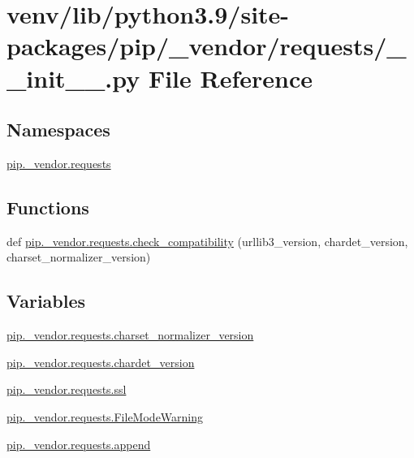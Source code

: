 \hypertarget{venv_2lib_2python3_89_2site-packages_2pip_2__vendor_2requests_2____init_____8py}{}\section{venv/lib/python3.9/site-\/packages/pip/\+\_\+vendor/requests/\+\_\+\+\_\+init\+\_\+\+\_\+.py File Reference}
\label{venv_2lib_2python3_89_2site-packages_2pip_2__vendor_2requests_2____init_____8py}
\subsection*{Namespaces}
\begin{DoxyCompactItemize}
\item 
 \hyperlink{namespacepip_1_1__vendor_1_1requests}{pip.\+\_\+vendor.\+requests}
\end{DoxyCompactItemize}
\subsection*{Functions}
\begin{DoxyCompactItemize}
\item 
def \hyperlink{namespacepip_1_1__vendor_1_1requests_afac6fb2e304d0bdeeb3797d48998fd24}{pip.\+\_\+vendor.\+requests.\+check\+\_\+compatibility} (urllib3\+\_\+version, chardet\+\_\+version, charset\+\_\+normalizer\+\_\+version)
\end{DoxyCompactItemize}
\subsection*{Variables}
\begin{DoxyCompactItemize}
\item 
\hyperlink{namespacepip_1_1__vendor_1_1requests_a12ad233ff0ac10e9d91df425e03bb468}{pip.\+\_\+vendor.\+requests.\+charset\+\_\+normalizer\+\_\+version}
\item 
\hyperlink{namespacepip_1_1__vendor_1_1requests_a0489c0432bbd0693c5103b454b5ef7db}{pip.\+\_\+vendor.\+requests.\+chardet\+\_\+version}
\item 
\hyperlink{namespacepip_1_1__vendor_1_1requests_a447f2d86dff42ce6da9835f347ad977b}{pip.\+\_\+vendor.\+requests.\+ssl}
\item 
\hyperlink{namespacepip_1_1__vendor_1_1requests_a2df473620db131b138d8aa6ee7ed8d70}{pip.\+\_\+vendor.\+requests.\+File\+Mode\+Warning}
\item 
\hyperlink{namespacepip_1_1__vendor_1_1requests_a3d60a561f70c88b392abad189d6d53b1}{pip.\+\_\+vendor.\+requests.\+append}
\end{DoxyCompactItemize}
